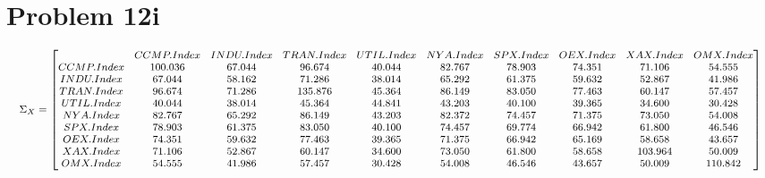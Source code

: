 \documentclass{article}
\begin{document}
\section*{Problem 12i}
\begin{equation*}
\begin{medsize}
\Sigma_X = 
\begin{bmatrix}{}
  & CCMP.Index & INDU.Index & TRAN.Index & UTIL.Index & NYA.Index & SPX.Index & OEX.Index & XAX.Index & OMX.Index \\ 
 CCMP.Index & 100.036 & 67.044 & 96.674 & 40.044 & 82.767 & 78.903 & 74.351 & 71.106 & 54.555 \\ 
  INDU.Index & 67.044 & 58.162 & 71.286 & 38.014 & 65.292 & 61.375 & 59.632 & 52.867 & 41.986 \\ 
  TRAN.Index & 96.674 & 71.286 & 135.876 & 45.364 & 86.149 & 83.050 & 77.463 & 60.147 & 57.457 \\ 
  UTIL.Index & 40.044 & 38.014 & 45.364 & 44.841 & 43.203 & 40.100 & 39.365 & 34.600 & 30.428 \\ 
  NYA.Index & 82.767 & 65.292 & 86.149 & 43.203 & 82.372 & 74.457 & 71.375 & 73.050 & 54.008 \\ 
  SPX.Index & 78.903 & 61.375 & 83.050 & 40.100 & 74.457 & 69.774 & 66.942 & 61.800 & 46.546 \\ 
  OEX.Index & 74.351 & 59.632 & 77.463 & 39.365 & 71.375 & 66.942 & 65.169 & 58.658 & 43.657 \\ 
  XAX.Index & 71.106 & 52.867 & 60.147 & 34.600 & 73.050 & 61.800 & 58.658 & 103.964 & 50.009 \\ 
  OMX.Index & 54.555 & 41.986 & 57.457 & 30.428 & 54.008 & 46.546 & 43.657 & 50.009 & 110.842 \\ 
  \end{bmatrix}
\end{medsize}
\end{equation*}
\end{document}
